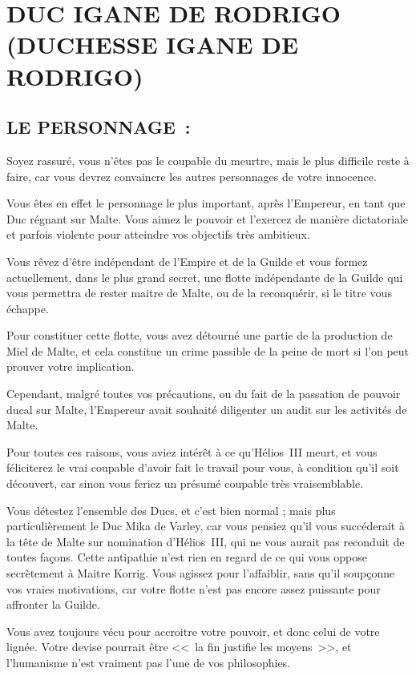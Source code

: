 \documentclass[14pt,twocolumn]{extarticle}
\begin{document}
\section{DUC IGANE DE RODRIGO\\(DUCHESSE IGANE DE RODRIGO)}

\subsection{LE PERSONNAGE~:}

Soyez rassuré, vous n'êtes pas le coupable du meurtre, mais le plus difficile
reste à faire, car vous devrez convaincre les autres personnages de votre
innocence.

Vous êtes en effet le personnage le plus important, après l'Empereur, en tant
que Duc régnant sur Malte. Vous aimez le pouvoir et l'exercez de manière
dictatoriale et parfois violente pour atteindre vos objectifs très ambitieux.

Vous rêvez d'être indépendant de l'Empire et de la Guilde et vous formez
actuellement, dans le plus grand secret, une flotte indépendante de la Guilde
qui vous permettra de rester maitre de Malte, ou de la reconquérir, si le titre
vous échappe.

Pour constituer cette flotte, vous avez détourné une partie de la production de
Miel de Malte, et cela constitue un crime passible de la peine de mort si l'on
peut prouver votre implication.

Cependant, malgré toutes vos précautions, ou du fait de la passation de pouvoir
ducal sur Malte, l'Empereur avait souhaité diligenter un audit sur les
activités de Malte.

Pour toutes ces raisons, vous aviez intérêt à ce qu'Hélios~III meurt, et vous
féliciterez le vrai coupable d'avoir fait le travail pour vous, à condition
qu'il soit découvert, car sinon vous feriez un présumé coupable très
vraisemblable.

Vous détestez l'ensemble des Ducs, et c'est bien normal ; mais plus
particulièrement le Duc Mika de Varley, car vous pensiez qu'il vous succéderait
à la tête de Malte sur nomination d'Hélios~III, qui ne vous aurait pas
reconduit de toutes façons. Cette antipathie n'est rien en regard de ce qui
vous oppose secrètement à Maitre Korrig. Vous agissez pour l'affaiblir, sans
qu'il soupçonne vos vraies motivations, car votre flotte n'est pas encore assez
puissante pour affronter la Guilde.

Vous avez toujours vécu pour accroitre votre pouvoir, et donc celui de votre
lignée. Votre devise pourrait être <<~la fin justifie les moyens~>>, et
l'humanisme n'est vraiment pas l'une de vos philosophies.
\end{document}
